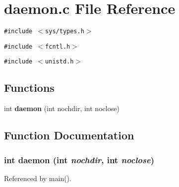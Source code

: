 \section{daemon.c File Reference}
\label{daemon_8c}
{\tt \#include $<$sys/types.h$>$}\par
{\tt \#include $<$fcntl.h$>$}\par
{\tt \#include $<$unistd.h$>$}\par
\subsection*{Functions}
\begin{CompactItemize}
\item 
int {\bf daemon} (int nochdir, int noclose)
\end{CompactItemize}


\subsection{Function Documentation}
\subsubsection[{daemon}]{\setlength{\rightskip}{0pt plus 5cm}int daemon (int {\em nochdir}, \/  int {\em noclose})}\label{daemon_8c_f298996def620cbda4cd529988218cb0}




Referenced by main().